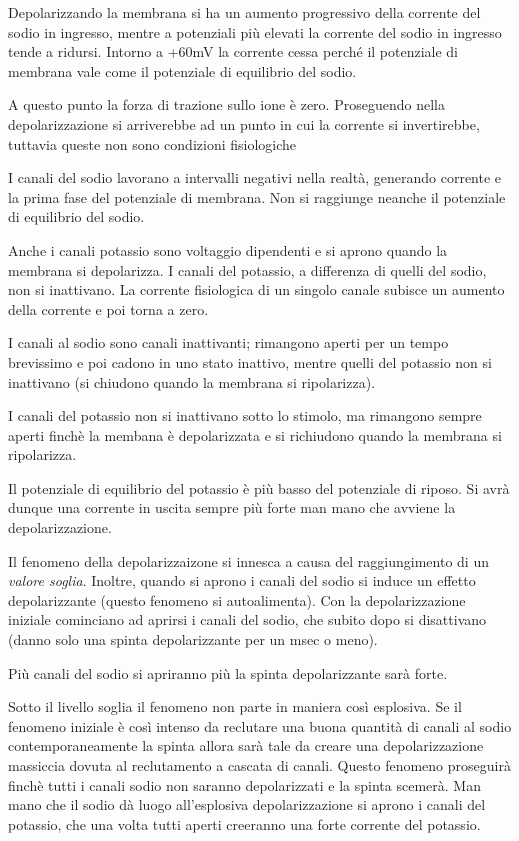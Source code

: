 \documentclass[]{article}
\begin{document}
Depolarizzando la membrana si ha un aumento progressivo della corrente
del sodio in ingresso, mentre a potenziali più elevati la corrente del
sodio in ingresso tende a ridursi. Intorno a +60mV la corrente cessa
perché il potenziale di membrana vale come il potenziale di equilibrio
del sodio.

A questo punto la forza di trazione sullo ione è zero. Proseguendo nella
depolarizzazione si arriverebbe ad un punto in cui la corrente si
invertirebbe, tuttavia queste non sono condizioni fisiologiche

I canali del sodio lavorano a intervalli negativi nella realtà,
generando corrente e la prima fase del potenziale di membrana. Non si
raggiunge neanche il potenziale di equilibrio del sodio.

Anche i canali potassio sono voltaggio dipendenti e si aprono quando la
membrana si depolarizza. I canali del potassio, a differenza di quelli
del sodio, non si inattivano. La corrente fisiologica di un singolo
canale subisce un aumento della corrente e poi torna a zero.

I canali al sodio sono canali inattivanti; rimangono aperti per un tempo
brevissimo e poi cadono in uno stato inattivo, mentre quelli del
potassio non si inattivano (si chiudono quando la membrana si
ripolarizza).

I canali del potassio non si inattivano sotto lo stimolo, ma rimangono
sempre aperti finchè la membana è depolarizzata e si richiudono quando
la membrana si ripolarizza.

Il potenziale di equilibrio del potassio è più basso del potenziale di
riposo. Si avrà dunque una corrente in uscita sempre più forte man mano
che avviene la depolarizzazione.

Il fenomeno della depolarizzaizone si innesca a causa del raggiungimento
di un \emph{valore soglia}. Inoltre, quando si aprono i canali del sodio
si induce un effetto depolarizzante (questo fenomeno si autoalimenta).
Con la depolarizzazione iniziale cominciano ad aprirsi i canali del
sodio, che subito dopo si disattivano (danno solo una spinta
depolarizzante per un msec o meno).

Più canali del sodio si apriranno più la spinta depolarizzante sarà
forte.

Sotto il livello soglia il fenomeno non parte in maniera così esplosiva.
Se il fenomeno iniziale è così intenso da reclutare una buona quantità
di canali al sodio contemporaneamente la spinta allora sarà tale da
creare una depolarizzazione massiccia dovuta al reclutamento a cascata
di canali. Questo fenomeno proseguirà finchè tutti i canali sodio non
saranno depolarizzati e la spinta scemerà. Man mano che il sodio dà
luogo all'esplosiva depolarizzazione si aprono i canali del potassio,
che una volta tutti aperti creeranno una forte corrente del potassio.
\end{document}
